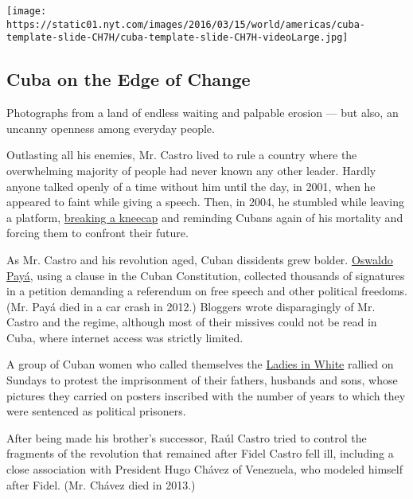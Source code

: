 \href{https://www.nytimes.com/interactive/2016/03/19/world/americas/cuba-on-the-edge-of-change-photo-essay.html}{}

\texttt{[image: https://static01.nyt.com/images/2016/03/15/world/americas/cuba-template-slide-CH7H/cuba-template-slide-CH7H-videoLarge.jpg]}

\hypertarget{cuba-on-the-edge-of-change}{%
\subsection{Cuba on the Edge of
Change}\label{cuba-on-the-edge-of-change}}

Photographs from a land of endless waiting and palpable erosion --- but
also, an uncanny openness among everyday people.

Outlasting all his enemies, Mr. Castro lived to rule a country where the
overwhelming majority of people had never known any other leader. Hardly
anyone talked openly of a time without him until the day, in 2001, when
he appeared to faint while giving a speech. Then, in 2004, he stumbled
while leaving a platform,
\href{http://www.nytimes.com/2004/10/23/international/americas/23cuba.html}{breaking
a kneecap} and reminding Cubans again of his mortality and forcing them
to confront their future.

As Mr. Castro and his revolution aged, Cuban dissidents grew bolder.
\href{http://www.nytimes.com/2003/05/20/world/dissident-accuses-cuba-of-manipulating-fear-of-us-invasion.html}{Oswaldo
Payá}, using a clause in the Cuban Constitution, collected thousands of
signatures in a petition demanding a referendum on free speech and other
political freedoms. (Mr. Payá died in a car crash in 2012.) Bloggers
wrote disparagingly of Mr. Castro and the regime, although most of their
missives could not be read in Cuba, where internet access was strictly
limited.

A group of Cuban women who called themselves the
\href{http://www.nytimes.com/video/multimedia/100000003389586/ladies-in-white-march-in-havana.html}{Ladies
in White} rallied on Sundays to protest the imprisonment of their
fathers, husbands and sons, whose pictures they carried on posters
inscribed with the number of years to which they were sentenced as
political prisoners.

After being made his brother's successor, Raúl Castro tried to control
the fragments of the revolution that remained after Fidel Castro fell
ill, including a close association with President Hugo Chávez of
Venezuela, who modeled himself after Fidel. (Mr. Chávez died in 2013.)

